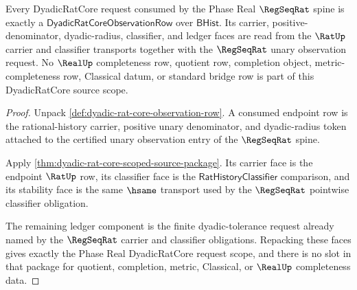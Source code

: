 \begin{theorem}
\label{thm:real-phase-dyadic-stream-regseq-scope}
Every DyadicRatCore request consumed by the Phase Real $\RegSeqRat$ spine is
exactly a $\mathsf{DyadicRatCoreObservationRow}$ over $\mathsf{BHist}$. Its
carrier, positive-denominator, dyadic-radius, classifier, and ledger faces are
read from the $\RatUp$ carrier and classifier transports together with the
$\RegSeqRat$ unary observation request. No $\RealUp$ completeness row, quotient
row, completion object, metric-completeness row, Classical datum, or standard
bridge row is part of this DyadicRatCore source scope.
\end{theorem}
\begin{proof}
Unpack \autoref{def:dyadic-rat-core-observation-row}. A consumed endpoint row is
the rational-history carrier, positive unary denominator, and dyadic-radius
token attached to the certified unary observation entry of the $\RegSeqRat$
spine.

Apply \autoref{thm:dyadic-rat-core-scoped-source-package}. Its carrier face is
the endpoint $\RatUp$ row, its classifier face is the
$\mathsf{RatHistoryClassifier}$ comparison, and its stability face is the same
$\hsame$ transport used by the $\RegSeqRat$ pointwise classifier obligation.

The remaining ledger component is the finite dyadic-tolerance request already
named by the $\RegSeqRat$ carrier and classifier obligations. Repacking these
faces gives exactly the Phase Real DyadicRatCore request scope, and there is no
slot in that package for quotient, completion, metric, Classical, or $\RealUp$
completeness data.
\end{proof}

